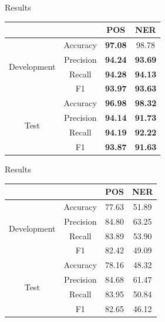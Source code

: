 \documentclass{beamer}
\begin{document}
\begin{frame}{Results}
    \begin{center}
    \begin{tabular}{ |c|c|c|c| }
    \hline
    & & {\textbf{POS}} & {\textbf{NER}}\\ \hline
    \multirow{4}{*}{Development} & Accuracy & \textbf{97.08} & 98.78 \\
     & Precision & \textbf{94.24} & \textbf{93.69} \\
     & Recall & \textbf{94.28} & \textbf{94.13} \\
     & F1 & \textbf{93.97} & \textbf{93.63} \\ \hline
    \multirow{4}{*}{Test} & Accuracy & \textbf{96.98} & \textbf{98.32} \\
     & Precision & \textbf{94.14} & \textbf{91.73} \\
     & Recall & \textbf{94.19} & \textbf{92.22} \\
     & F1 & \textbf{93.87} & \textbf{91.63} \\ \hline
    \end{tabular}
    \label{tab:no_dropout}
    \end{center}
\end{frame}



\begin{frame}{Results}
    \begin{center}
    \begin{tabular}{ |c|c|c|c| }
    \hline
    & & {\textbf{POS}} & {\textbf{NER}}\\ \hline
    \multirow{4}{*}{Development} & Accuracy & 77.63 & 51.89 \\
     & Precision & 84.80  & 63.25 \\
     & Recall & 83.89 & 53.90 \\
     & F1 & 82.42 & 49.09 \\ \hline
    \multirow{4}{*}{Test} & Accuracy & 78.16 & 48.32 \\
     & Precision & 84.68 & 61.47 \\
     & Recall & 83.95 & 50.84 \\
     & F1 & 82.65 & 46.12 \\ \hline
    \end{tabular}
    \label{tab:no_crf}
    \end{center}
\end{frame}
\end{document}
